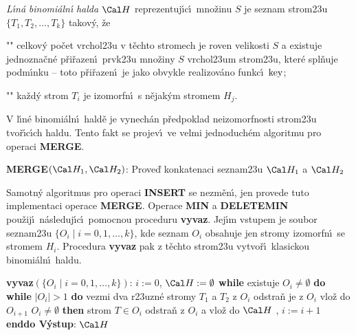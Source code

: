 \flushpar\emph{L\'\i n\'a} \emph{binomi\'aln\'\i} \emph{halda} $\Cal H$ 
reprezentuj\'\i c\'\i\ mno\v zinu $S$ je seznam strom\accent23u 
$\{T_1,T_2,\dots,T_k\}$ takov\'y, \v ze  
\roster
\item"{}"
celkov\'y po\v cet vrchol\accent23u v t\v echto stromech je 
roven velikosti $S$ a 
existuje jednozna\v cn\'e p\v ri\v razen\'\i\ prvk\accent23u mno\v ziny 
$S$ vrchol\accent23um strom\accent23u, kter\'e spl\v nuje 
podm\'\i nku  -- toto p\v ri\v razen\'\i\ je jako obvykle 
realizov\'ano funkc\'\i\ $\operatorname{key}$;
\item"{}"
ka\v zd\'y strom $T_i$ je izomorfn\'\i\ s n\v ejak\'ym stromem $H_
j$.
\endroster
\medskip

\flushpar V l\'\i n\'e binomi\'aln\'\i\ hald\v e je vynech\'an p\v redpoklad 
neizo\-morf\-nosti strom\accent23u tvo\v r\'\i c\'\i ch haldu. Tento fakt se 
projev\'\i\ ve velmi jednoduch\'em algoritmu pro operaci 
{\bf MERGE}.
\bigskip

{\bf MERGE$(\Cal H_1,\Cal H_2)$}:\newline 
Prove\v d konkatenaci seznam\accent23u $\Cal H_1$ a $\Cal H_2$
\bigskip

\flushpar Samotn\'y algoritmus pro operaci {\bf INSERT} se nezm\v en\'\i , jen 
provede tuto implementaci ope\-race {\bf MER\-GE}.  Ope\-race 
{\bf MIN} a {\bf DELETE\-MIN} pou\v zij\'\i\ n\'asleduj\'\i c\'\i\ pomocnou 
proceduru {\bf vyvaz}.  Jej\'\i m vstu\-pem je soubor 
seznam\accent23u $\{O_i\mid i=0,1,\dots,k\}$, kde seznam $O_i$ 
obsahuje jen stromy izomorfn\'\i\ se stromem $H_i$.  
Procedura {\bf vyvaz} pak z t\v echto strom\accent23u vytvo\v r\'\i\ 
klasickou binomi\'aln\'\i\ hal\-du. 
\bigskip

{\bf vyvaz$(\{O_i\mid i=0,1,\dots,k\})$}:\newline 
$i:=0$, $\Cal H:=\emptyset$\newline 
{\bf while} existuje $O_i\ne\emptyset$ {\bf do\newline 
\phantom{{\rm ---}}while} $|O_i|>1$ {\bf do\newline 
\phantom{{\rm ------}}}vezmi dva r\accent23uzn\'e stromy $T_1$ a $
T_2$ z 
$O_i$\newline 
\phantom{------}odstra\v n je z $O_i$\newline 
\phantom{------}{\bf spoj$(T_1,T_2)$} vlo\v z do $O_{i+1}$\newline 
{} $O_i\ne\emptyset$ {\bf then\newline 
\phantom{{\rm ------}}}strom $T\in O_i$ odstra\v n z $O_i$ a vlo\v z do $
\Cal H$\newline 
\phantom{---}{\bf endif},\newline 
\phantom{---}$i:=i+1$\newline 
{\bf enddo\newline 
V\'ystup}: $\Cal H$
\bigskip

